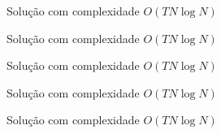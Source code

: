 \begin{frame}[fragile]{Solução com complexidade $O(TN\log N)$}
\end{frame}

\begin{frame}[fragile]{Solução com complexidade $O(TN\log N)$}
\end{frame}

\begin{frame}[fragile]{Solução com complexidade $O(TN\log N)$}
\end{frame}

\begin{frame}[fragile]{Solução com complexidade $O(TN\log N)$}
\end{frame}

\begin{frame}[fragile]{Solução com complexidade $O(TN\log N)$}
\end{frame}
